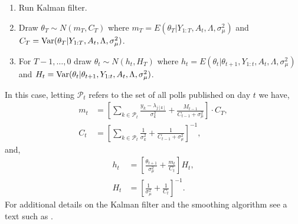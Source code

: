 \documentclass[12pt,final,fleqn]{article}
\theoremstyle{plain}
\newcommand\var{{\rm Var}}
\begin{document}
\begin{enumerate}
\begin{enumerate}
\item Run Kalman filter.
\item Draw $\theta_T \sim N(m_T, C_T)$ where $m_T = E(\theta_T|Y_{1:T}, A_t, \Lambda, \sigma^2_\mu)$ and $C_T = \var(\theta_T | Y_{1:T}, A_t, \Lambda, \sigma^2_\mu)$.
\item For $T-1, \ldots, 0$ draw $\theta_t \sim N(h_t, H_T)$ where $h_t = E(\theta_t|\theta_{t+1}, Y_{1:t}, A_t, \Lambda, \sigma^2_\mu)$ and $H_t = \var(\theta_t|\theta_{t+1}, Y_{1:t}, A_t, \Lambda, \sigma^2_\mu)$.
\end{enumerate}
In this case, letting $\mathcal{P}_t$ refers to the set of all polls published on day $t$ we have,
\begin{align}
m_t &= \left[\sum_{k \in \mathcal{P}_t} \frac{y_k - \lambda_{j[k]}}{\sigma^2_k} + \frac{M_{t-1}}{C_{t-1} + \sigma^2_\mu}\right]\cdot C_T,\\
C_t &= \left[\sum_{k \in \mathcal{P}_t} \frac{1}{\sigma^2_k} + \frac{1}{C_{t-1} + \sigma^2_\mu} \right]^{-1},
\end{align}
and,
\begin{align}
h_t &= \left[\frac{\theta_{t+1}}{\sigma^2_\mu}+ \frac{m_t}{C_t}\right]H_t, \\
H_t &= \left[\frac{1}{\sigma^2_\mu} + \frac{1}{C_t}\right]^{-1}.
\end{align}
For additional details on the Kalman filter and the smoothing algorithm see a text such as \citet{west1997bayesian}.
\end{enumerate}
\end{document}
